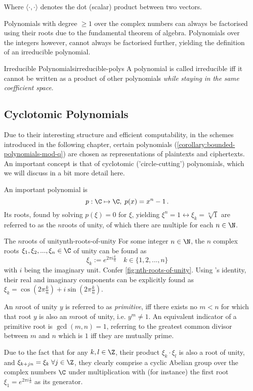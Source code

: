 Where $\langle \cdot, \cdot \rangle$ denotes the dot (scalar) product between two vectors.

Polynomials with degree $\geq 1$ over the complex numbers can always be factorised using their roots due to the fundamental theorem of algebra.
Polynomials over the integers however, cannot always be factorised further, yielding the definition of an irreducible polynomial.

\begin{definition}{Irreducible Polynomials}{irreducible-polys}
  A polynomial is called irreducible \gls{iff} it cannot be written as a product of other polynomials \textsl{while staying in the same coefficient space}.
\end{definition}

\subsection{Cyclotomic Polynomials}
Due to their interesting structure and efficient computability, in the schemes introduced in the following chapter, certain polynomials (\cref{corollary:bounded-polynomials-mod-q}) are chosen as representations of plaintexts and ciphertexts.
An important concept is that of cyclotomic ('circle-cutting') polynomials, which we will discuss in a bit more detail here.

An important polynomial is $$p: \C \mapsto \C, \; p(x) = x^n - 1 \,.$$
Its roots, found by solving $p(\xi) = 0$ for $\xi$, yielding $\xi^n = 1 \leftrightarrow \xi_k = \sqrt[n]{1}$ are referred to as the $n$\th roots of unity, of which there are multiple for each $n \in \N$.

\begin{lemma}{The $n$\th roots of unity}{nth-roots-of-unity}
  For some integer $n \in \N$, the $n$ complex roots $\xi_1, \xi_2, ..., \xi_n \in \C$ of unity can be found as $$\xi_k := e^{2\pi i \frac{k}{n}} \quad k \in \{1, 2, ..., n\}$$ with $i$ being the imaginary unit.
  Confer \cref{fig:nth-roots-of-unity}.
  Using 's identity, their real and imaginary components can be explicitly found as $\xi_k = \cos(2\pi \frac{k}{n}) + i \sin(2\pi \frac{k}{n})$.

  An $n$\th root of unity $y$ is referred to as \textit{primitive}, \gls{iff} there exists no $m < n$ for which that root $y$ is also an $m$\th root of unity, i.e. $y^m \neq 1$.
  An equivalent indicator of a primitive root is $\gcd(m, n) = 1$, referring to the greatest common divisor between $m$ and $n$ which is $1$ \gls{iff} they are mutually prime.
\end{lemma}
Due to the fact that for any $k, l \in \Z$, their product $\xi_k \cdot \xi_l$ is also a root of unity, and $\xi_{k+jn} = \xi_k \; \forall j \in \Z$, they clearly comprise a cyclic Abelian group over the complex numbers $\C$ under multiplication with (for instance) the first root $\xi_1 = e^{2\pi i \frac{1}{n}}$ as its generator.

